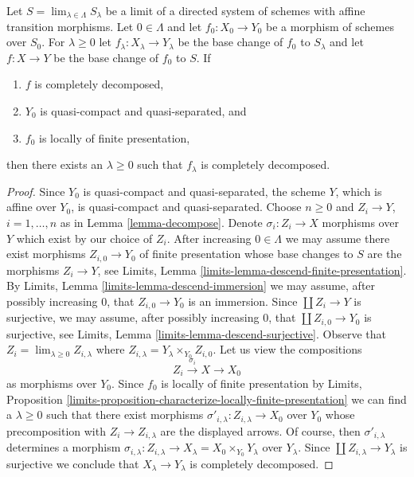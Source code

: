 \begin{lemma}
\label{lemma-descend-cd}
Let $S = \lim_{\lambda \in \Lambda} S_\lambda$
be a limit of a directed system of schemes with affine transition morphisms.
Let $0 \in \Lambda$ and let $f_0 : X_0 \to Y_0$
be a morphism of schemes over $S_0$.
For $\lambda \geq 0$ let $f_\lambda : X_\lambda \to Y_\lambda$
be the base change of $f_0$ to $S_\lambda$ and
let $f : X \to Y$ be the base change of $f_0$ to $S$. If
\begin{enumerate}
\item $f$ is completely decomposed,
\item $Y_0$ is quasi-compact and quasi-separated, and
\item $f_0$ is locally of finite presentation,
\end{enumerate}
then there exists an $\lambda \geq 0$ such that $f_\lambda$
is completely decomposed.
\end{lemma}

\begin{proof}
Since $Y_0$ is quasi-compact and quasi-separated, the scheme $Y$,
which is affine over $Y_0$, is quasi-compact and quasi-separated.
Choose $n \geq 0$ and $Z_i \to Y$, $i = 1, \ldots, n$ as in
Lemma \ref{lemma-decompose}. Denote $\sigma_i : Z_i \to X$
morphisms over $Y$ which exist by our choice of $Z_i$.
After increasing $0 \in \Lambda$ we may assume there exist
morphisms $Z_{i, 0} \to Y_0$ of finite presentation
whose base changes to $S$ are the morphisms $Z_i \to Y$, see
Limits, Lemma \ref{limits-lemma-descend-finite-presentation}.
By Limits, Lemma \ref{limits-lemma-descend-immersion}
we may assume, after possibly increasing $0$, that $Z_{i, 0} \to Y_0$
is an immersion. Since $\coprod Z_i \to Y$ is surjective, we may assume,
after possibly increasing $0$, that
$\coprod Z_{i, 0} \to Y_0$ is surjective, see
Limits, Lemma \ref{limits-lemma-descend-surjective}. Observe that
$Z_i = \lim_{\lambda \geq 0} Z_{i, \lambda}$
where $Z_{i, \lambda} = Y_\lambda \times_{Y_0} Z_{i, 0}$.
Let us view the compositions
$$
Z_i \xrightarrow{\sigma_i} X \to X_0
$$
as morphisms over $Y_0$. Since $f_0$ is locally of finite
presentation by Limits, Proposition
\ref{limits-proposition-characterize-locally-finite-presentation}
we can find a $\lambda \geq 0$ such that there exist
morphisms $\sigma'_{i, \lambda} : Z_{i, \lambda} \to X_0$
over $Y_0$ whose precomposition with $Z_i \to Z_{i, \lambda}$
are the displayed arrows. Of course, then $\sigma'_{i, \lambda}$
determines a morphism $\sigma_{i, \lambda} : Z_{i, \lambda} \to
X_\lambda = X_0 \times_{Y_0} Y_\lambda$ over $Y_\lambda$.
Since $\coprod Z_{i, \lambda} \to Y_\lambda$ is surjective
we conclude that $X_\lambda \to Y_\lambda$ is completely decomposed.
\end{proof}




